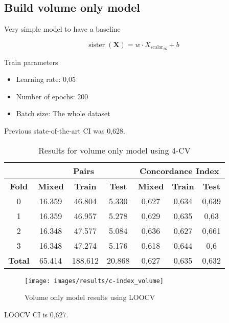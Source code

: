 \subsection{Build volume only model}
\begin{frame}{\insertsubsec}
  Very simple model to have a baseline

  \[
    \operatorname{sister}(\bm{X}) = w\cdot X_{\text{scalar}_{26}} + b
  \]

  \begin{block}{Train parameters}
    \begin{itemize}
      \item Learning rate: 0,05
      \item Number of epochs: 200
      \item Batch size: The whole dataset
    \end{itemize}
  \end{block}
\end{frame}
\begin{frame}
  Previous state-of-the-art CI was 0,628.

  \begin{table}
    \centering
    \begin{tabular}{|c||c|c|c||c|c|c|}
      \cline{2-7}
      \multicolumn{1}{c|}{} & \multicolumn{3}{|c||}{\textbf{Pairs}} & 
      \multicolumn{3}{c|}{\textbf{Concordance Index}} \\
      \hline
      \textbf{Fold} & \textbf{Mixed} & \textbf{Train} & \textbf{Test} 
      & \textbf{Mixed} & \textbf{Train} & \textbf{Test} \\
      \hhline{=======}
      0 & 16.359 & 46.804 & 5.330 & 0,627 & 0,634 & 0,639 \\
      1 & 16.359 & 46.957 & 5.278 & 0,629 & 0,635 & 0,63 \\
      2 & 16.348 & 47.577 & 5.084 & 0,636 & 0,627 & 0,661 \\
      3 & 16.348 & 47.274 & 5.176 & 0,618 & 0,644 & 0,6 \\
      \hhline{=======}
      \textbf{Total} & 65.414 & 188.612 & 20.868 & 0,627 & 0,635 & 0,632 \\
      \hline
    \end{tabular}
  
    \caption[Volume Only 4-CV results]{
      Results for volume only model using 4-CV \label{tab:results-volume-4CV}
    }
  \end{table}
\end{frame}

\begin{frame}
  \begin{figure}
    \centering
    \texttt{[image: images/results/c-index\_volume]}
    \caption[LOOCV volume only model results]{
      Volume only model results using LOOCV \label{fig:results-volume-LOOCV}
    }
  \end{figure}
  LOOCV CI is 0,627.
\end{frame}

